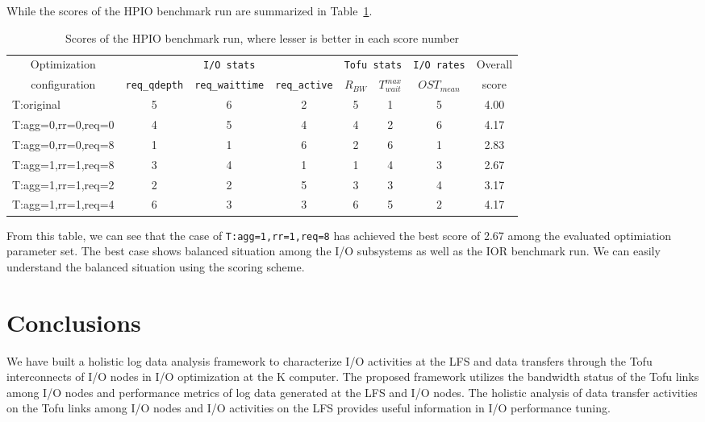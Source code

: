 \documentclass{jhps}
\begin{document}
While the scores of the HPIO benchmark run are summarized in
Table~\ref{tbl:HPIO_OVERALL_EVAL}.
%
\begin{table}[tb]
\caption{Scores of the HPIO benchmark run, where lesser is better in each score number}
\centering
\begin{tabular}{lccccccc}
\hline
\multicolumn{1}{c}{Optimization}  & \multicolumn{3}{c}{{\tt I/O stats}} & \multicolumn{2}{c}{{\tt Tofu stats}} & {\tt I/O rates} & Overall \\
\multicolumn{1}{c}{configuration} & {\tt req\_qdepth} & {\tt req\_waittime} & {\tt req\_active} &  $R_{BW}$ & $T_{wait}^{max}$ & $OST_{mean}$ & score \\
\hline
T:original         & 5 & 6 & 2 & 5 & 1 & 5 & 4.00 \\
T:agg=0,rr=0,req=0 & 4 & 5 & 4 & 4 & 2 & 6 & 4.17 \\
T:agg=0,rr=0,req=8 & 1 & 1 & 6 & 2 & 6 & 1 & 2.83 \\
T:agg=1,rr=1,req=8 & 3 & 4 & 1 & 1 & 4 & 3 & 2.67 \\
T:agg=1,rr=1,req=2 & 2 & 2 & 5 & 3 & 3 & 4 & 3.17 \\
T:agg=1,rr=1,req=4 & 6 & 3 & 3 & 6 & 5 & 2 & 4.17 \\
\hline
\end{tabular}
\label{tbl:HPIO_OVERALL_EVAL}
\end{table}
%
From this table, we can see that the case of {\tt T:agg=1,rr=1,req=8}
has achieved the best score of 2.67 among the evaluated optimiation parameter set.
The best case shows balanced situation among the I/O subsystems
as well as the IOR benchmark run.
We can easily understand the balanced situation using the scoring scheme.

\section{Conclusions}
\label{sec:CONCLUSIONS}

We have built a holistic log data analysis framework to characterize I/O activities
at the LFS and data transfers through the Tofu interconnects of I/O nodes
in I/O optimization at the K computer.
The proposed framework utilizes the bandwidth status of the Tofu links
among I/O nodes and performance metrics of log data generated at the LFS and I/O nodes.
The holistic analysis of data transfer activities on the Tofu links among I/O nodes
and I/O activities on the LFS provides useful information in I/O performance tuning.
\end{document}
